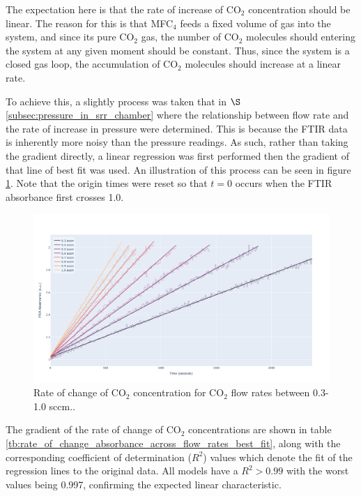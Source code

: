 The expectation here is that the rate of increase of CO$_2$ concentration should be linear. The reason for this is that MFC$_4$ feeds a fixed volume of gas into the system, and since its pure CO$_2$ gas, the number of CO$_2$ molecules should entering the system at any given moment should be constant. Thus, since the system is a closed gas loop, the accumulation of CO$_2$ molecules should increase at a linear rate.

To achieve this, a slightly process was taken that in $\S$ \ref{subsec:pressure_in_srr_chamber} where the relationship between flow rate and the rate of increase in pressure were determined. This is because the FTIR data is inherently more noisy than the pressure readings. As such, rather than taking the gradient directly, a linear regression was first performed then the gradient of that line of best fit was used. An illustration of this process can be seen in figure \ref{fig:co2_characterisation_rate_of_increase_linearised}. Note that the origin times were reset so that $t = 0$ occurs when the FTIR absorbance first crosses 1.0.

\begin{figure}[h!]
	\centering
	\includegraphics[width=\linewidth]{chapter_5/figures/co2_characterisation_rate_of_increase_linearised.png}
	\caption{Rate of change of CO$_2$ concentration for CO$_2$ flow rates between 0.3-1.0 sccm..}
	\label{fig:co2_characterisation_rate_of_increase_linearised}
\end{figure}

The gradient of the rate of change of CO$_2$ concentrations are shown in table \ref{tb:rate_of_change_absorbance_across_flow_rates_best_fit}, along with the corresponding coefficient of determination ($R^2$) values which denote the fit of the regression lines to the original data. All models have a $R^2 > 0.99$ with the worst values being 0.997, confirming the expected linear characteristic. 

